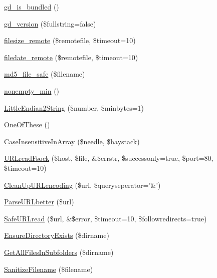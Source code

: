\begin{DoxyCompactItemize}
\item 
\hyperlink{classphpthumb__functions_adfd72c199df2f74f6daeda7c06a18cae}{gd\-\_\-is\-\_\-bundled} ()
\item 
\hyperlink{classphpthumb__functions_aaaad487d4c5a61befc88ae061f8a64fe}{gd\-\_\-version} (\$fullstring=false)
\item 
\hyperlink{classphpthumb__functions_a509475456ea11addf53c89bc1d930934}{filesize\-\_\-remote} (\$remotefile, \$timeout=10)
\item 
\hyperlink{classphpthumb__functions_aba89973c12394df012c7cf7ceb283cec}{filedate\-\_\-remote} (\$remotefile, \$timeout=10)
\item 
\hyperlink{classphpthumb__functions_a992583009b07598f893b8b6773513926}{md5\-\_\-file\-\_\-safe} (\$filename)
\item 
\hyperlink{classphpthumb__functions_a0c2feb0df02b7a87435be3645fee8224}{nonempty\-\_\-min} ()
\item 
\hyperlink{classphpthumb__functions_ac7fc6323d3639f4244b23d462d0fbdcb}{\-Little\-Endian2\-String} (\$number, \$minbytes=1)
\item 
\hyperlink{classphpthumb__functions_ada951f9ad225b459c5f4d5974aa82765}{\-One\-Of\-These} ()
\item 
\hyperlink{classphpthumb__functions_ad364cc6286f8223df18cc27695c8db4b}{\-Case\-Insensitive\-In\-Array} (\$needle, \$haystack)
\item 
\hyperlink{classphpthumb__functions_a53dae9e5e9604e546f0e4f836fc69240}{\-U\-R\-Lread\-Fsock} (\$host, \$file, \&\$errstr, \$successonly=true, \$port=80, \$timeout=10)
\item 
\hyperlink{classphpthumb__functions_a0ee9ff5a7384b1b204b77ad31f4588f3}{\-Clean\-Up\-U\-R\-Lencoding} (\$url, \$queryseperator='\&')
\item 
\hyperlink{classphpthumb__functions_ad7ede725cfcb053c5dbd50308deca6cd}{\-Parse\-U\-R\-Lbetter} (\$url)
\item 
\hyperlink{classphpthumb__functions_ab3a344937946aa396752b10e457f8d73}{\-Safe\-U\-R\-Lread} (\$url, \&\$error, \$timeout=10, \$followredirects=true)
\item 
\hyperlink{classphpthumb__functions_a224289e3e7fff1ccd097aae04b3ed181}{\-Ensure\-Directory\-Exists} (\$dirname)
\item 
\hyperlink{classphpthumb__functions_a6334e519682ebb7db2d1201f4682edc4}{\-Get\-All\-Files\-In\-Subfolders} (\$dirname)
\item 
\hyperlink{classphpthumb__functions_a110676c86529253850f744796baeb62d}{\-Sanitize\-Filename} (\$filename)
\end{DoxyCompactItemize}


